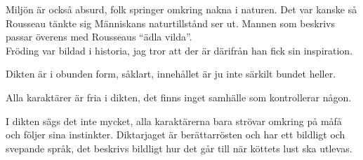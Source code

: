 \documentclass[12pt, letterpaper, twoside]{article}
\begin{document}
Miljön är också absurd, folk springer omkring nakna i naturen. Det var kanske så Rousseau tänkte sig
Människans naturtillstånd ser ut. Mannen som beskrivs passar överens med Rousseaus ``ädla vilda''.\\
Fröding var bildad i historia, jag tror att der är därifrån han fick sin inspiration.

Dikten är i obunden form, såklart, innehållet är ju inte särkilt bundet heller.

Alla karaktärer är fria i dikten, det finns inget samhälle som kontrollerar någon.

I dikten sägs det inte mycket, alla karaktärerna bara strövar omkring på måfå och följer sina instinkter.
Diktarjaget är berättarrösten och har ett bildligt och svepande språk, det beskrivs bildligt hur
det går till när köttets lust ska utlevas.
\end{document}
